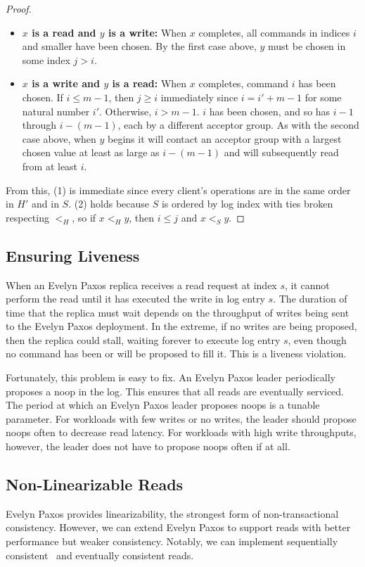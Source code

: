 \begin{proof}
\begin{itemize}
    \item \textbf{$x$ is a read and $y$ is a write:}
      When $x$ completes, all commands in indices $i$ and smaller have been
      chosen. By the first case above, $y$ must be chosen in some index $j >
      i$.

    \item \textbf{$x$ is a write and $y$ is a read:}
      When $x$ completes, command $i$ has been chosen. If $i \leq m-1$, then $j \geq
      i$ immediately since $i = i' + m - 1$ for some natural number $i'$.
      Otherwise, $i > m - 1$. $i$ has been chosen, and so has $i-1$ through
      $i-(m-1)$, each by a different acceptor group.
      As with the second case above, when $y$ begins it will contact an
      acceptor group with a largest chosen value at least as large as $i-(m-1)$
      and will subsequently read from at least $i$.
  \end{itemize}

  From this, (1) is immediate since every client's operations are in the same
  order in $H'$ and in $S$. (2) holds because $S$ is ordered by log index with
  ties broken respecting $<_H$, so if $x <_H y$, then $i \leq j$ and $x <_S y$.
\end{proof}

\subsection{Ensuring Liveness}
When an Evelyn Paxos replica receives a read request at index $s$, it cannot
perform the read until it has executed the write in log entry $s$. The duration
of time that the replica must wait depends on the throughput of writes being
sent to the Evelyn Paxos deployment. In the extreme, if no writes are being
proposed, then the replica could stall, waiting forever to execute log entry
$s$, even though no command has been or will be proposed to fill it. This is a
liveness violation.

Fortunately, this problem is easy to fix. An Evelyn Paxos leader periodically
proposes a noop in the log. This ensures that all reads are eventually
serviced. The period at which an Evelyn Paxos leader proposes noops is a
tunable parameter. For workloads with few writes or no writes, the leader
should propose noops often to decrease read latency. For workloads with high
write throughputs, however, the leader does not have to propose noops often if
at all.

\subsection{Non-Linearizable Reads}
Evelyn Paxos provides linearizability, the strongest form of non-transactional
consistency. However, we can extend Evelyn Paxos to support reads with better
performance but weaker consistency. Notably, we can implement sequentially
consistent~\cite{lamport1979make} and eventually consistent reads.

